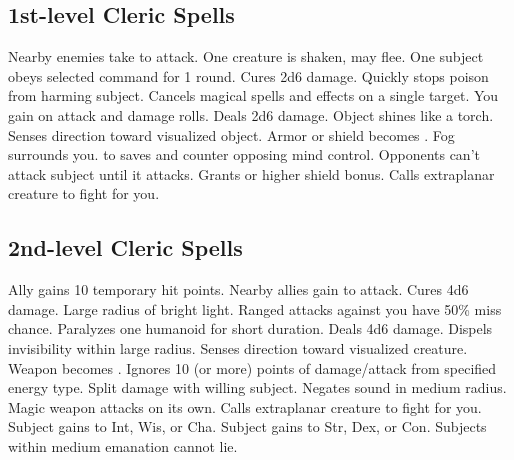 \subsection{1st-level Cleric Spells}
\begin{spelllist}
   Nearby enemies take  to attack.
   One creature is shaken, may flee.
   One subject obeys selected command for 1 round.
   Cures 2d6 damage.
   Quickly stops poison from harming subject.
   Cancels magical spells and effects on a single target.
   You gain  on attack and damage rolls.
   Deals 2d6 damage.
   Object shines like a torch.
   Senses direction toward visualized object.
   Armor or shield becomes .
   Fog surrounds you.
    to saves and counter opposing mind control.
   Opponents can't attack subject until it attacks.
   Grants  or higher shield bonus.
   Calls extraplanar creature to fight for you.
\end{spelllist}

\subsection{2nd-level Cleric Spells}
\begin{spelllist}
   Ally gains 10 temporary hit points.
   Nearby allies gain  to attack.
   Cures 4d6 damage.
   Large radius of bright light.
   Ranged attacks against you have 50\% miss chance.
   Paralyzes one humanoid for short duration.
   Deals 4d6 damage.
   Dispels invisibility within large radius.
   Senses direction toward visualized creature.
   Weapon becomes .
   Ignores 10 (or more) points of damage/attack from specified energy type.
    Split damage with willing subject.
   Negates sound in medium radius.
   Magic weapon attacks on its own.
   Calls extraplanar creature to fight for you.
   Subject gains  to Int, Wis, or Cha.
   Subject gains  to Str, Dex, or Con.
   Subjects within medium emanation cannot lie.
\end{spelllist}

